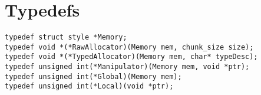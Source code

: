 \documentclass{article}
\begin{document}
\section{Typedefs} 
\begin{verbatim}
typedef struct style *Memory;
typedef void *(*RawAllocator)(Memory mem, chunk_size size);
typedef void *(*TypedAllocator)(Memory mem, char* typeDesc);
typedef unsigned int(*Manipulator)(Memory mem, void *ptr);
typedef unsigned int(*Global)(Memory mem);
typedef unsigned int(*Local)(void *ptr);
\end{verbatim}
\end{document}
